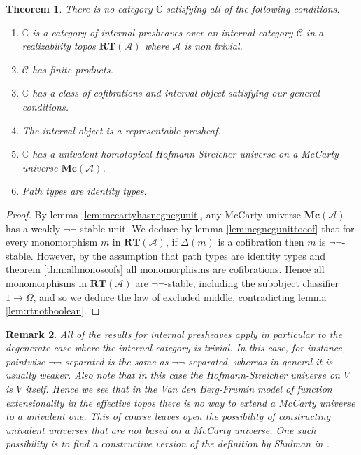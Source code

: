\documentclass[a4paper]{amsart}
\newtheorem{theorem}{Theorem}[section]
\newtheorem{remark}[theorem]{Remark}
\theoremstyle{definition}
\newcommand{\cat}[1]{\mathbb{#1}}
\newcommand{\catc}{\cat{C}}
\newcommand{\smcat}[1]{\mathcal{#1}}
\newcommand{\pcaa}{\mathcal{A}}
\newcommand{\rt}{\mathbf{RT}}
\newcommand{\mc}{\mathbf{Mc}}
\begin{document}
\begin{theorem}
  There is no category $\catc$ satisfying all of the following
  conditions.
  \begin{enumerate}
  \item $\catc$ is a category of internal presheaves over an internal
    category $\smcat{C}$ in a realizability topos $\rt(\pcaa)$ where
    $\pcaa$ is non trivial.
  \item $\smcat{C}$ has finite products.
  \item $\catc$ has a class of cofibrations and interval object
    satisfying our general conditions.
  \item The interval object is a representable presheaf.
  \item $\catc$ has a univalent homotopical Hofmann-Streicher universe
    on a McCarty universe $\mc(\pcaa)$.
  \item Path types are identity types.
  \end{enumerate}
\end{theorem}

\begin{proof}
  By lemma \ref{lem:mccartyhasnegnegunit}, any McCarty universe $\mc(\pcaa)$
  has a weakly $\neg \neg$-stable unit. We deduce by lemma
  \ref{lem:negnegunittocof} that for every
  monomorphism $m$ in $\rt(\pcaa)$, if $\Delta(m)$ is a cofibration then
  $m$ is $\neg \neg$-stable. However, by
  the assumption that path types are identity types and theorem
  \ref{thm:allmonoscofs} all monomorphisms are cofibrations. Hence all
  monomorphisms in $\rt(\pcaa)$ are $\neg \neg$-stable, including the subobject
  classifier $1 \to \Omega$, and so we deduce the law of
  excluded middle, contradicting lemma \ref{lem:rtnotboolean}.
\end{proof}

\begin{remark}
  All of the results for internal presheaves apply in particular to
  the degenerate case where the internal category is trivial. In this
  case, for instance, pointwise $\neg \neg$-separated is the same as
  $\neg \neg$-separated, whereas in general it is usually weaker. Also
  note that in this case the Hofmann-Streicher universe on $V$ is $V$
  itself. Hence we see that in the Van den Berg-Frumin model of
  function extensionality in the effective topos there is no way to
  extend a McCarty universe to a univalent one. This of course leaves
  open the possibility of constructing univalent universes that are
  not based on a McCarty universe. One such possibility is to find a
  constructive version of the definition by Shulman in \cite[Section
  3]{shulmanelegantreedy}.
\end{remark}
\end{document}
